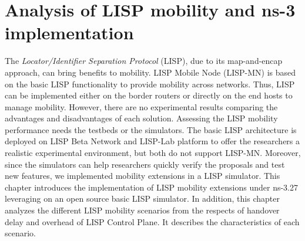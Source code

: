 
\chapter{Analysis of LISP mobility and ns-3 implementation}
\label{cha:ns-3}

\ifpdf
    \graphicspath{{Chapter7/Pics/Raster/}{Chapter7/Pics/PDF/}{Chapter7/}}
\else
    \graphicspath{{Chapter7/Pics/Vector/}{Chapter7/}}
\fi

The \emph{Locator/Identifier Separation Protocol} (LISP), due to its map-and-encap approach, can bring benefits to mobility. LISP Mobile Node (LISP-MN) is based on the basic LISP functionality to provide mobility across networks. Thus, LISP can be implemented either on the border routers or directly on the end hosts to manage mobility. However, there are no experimental results comparing the advantages and disadvantages of each solution. Assessing the LISP mobility performance needs the testbeds or the simulators. The basic LISP architecture is deployed on LISP Beta Network and LISP-Lab platform to offer the researchers a realistic experimental environment, but both do not support LISP-MN. Moreover, since the simulators can help researchers quickly verify the proposals and test new features, we implemented mobility extensions in a LISP simulator.
This chapter introduces the implementation of LISP mobility extensions under ns-3.27 leveraging on an open source basic LISP simulator. In addition, this chapter analyzes the different LISP mobility scenarios from the respects of handover delay and overhead of LISP Control Plane. It describes the characteristics of each scenario. %

